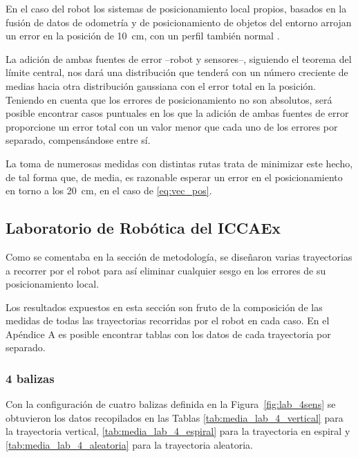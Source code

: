En el caso del robot los sistemas de posicionamiento local propios, basados en la fusión de datos de odometría y de posicionamiento de objetos del entorno arrojan un error en la posición de 10~cm, con un perfil también normal \cite{POSRobot}.

La adición de ambas fuentes de error --robot y sensores--, siguiendo el teorema del límite central, nos dará una distribución que tenderá con un número creciente de medias hacia otra distribución gaussiana con el error total en la posición.
Teniendo en cuenta que los errores de posicionamiento no son absolutos, será posible encontrar casos puntuales en los que la adición de ambas fuentes de error proporcione un error total con un valor menor que cada uno de los errores por separado, compensándose entre sí.

La toma de numerosas medidas con distintas rutas trata de minimizar este hecho, de tal forma que, de media, es razonable esperar un error en el posicionamiento en torno a los 20~cm, en el caso de \eqref{eq:vec_pos}.

\subsection{Laboratorio de Robótica del ICCAEx}

Como se comentaba en la sección de metodología, se diseñaron varias trayectorias a recorrer por el robot para así eliminar cualquier sesgo en los errores de su posicionamiento local.

Los resultados expuestos en esta sección son fruto de la composición de las medidas de todas las trayectorias recorridas por el robot en cada caso.
En el Apéndice A es posible encontrar tablas con los datos de cada trayectoria por separado.

\subsubsection{4 balizas}

Con la configuración de cuatro balizas definida en la Figura~\ref{fig:lab_4sens} se obtuvieron los datos recopilados en las Tablas \ref{tab:media_lab_4_vertical} para la trayectoria vertical, \ref{tab:media_lab_4_espiral} para la trayectoria en espiral y \ref{tab:media_lab_4_aleatoria} para la trayectoria aleatoria.

